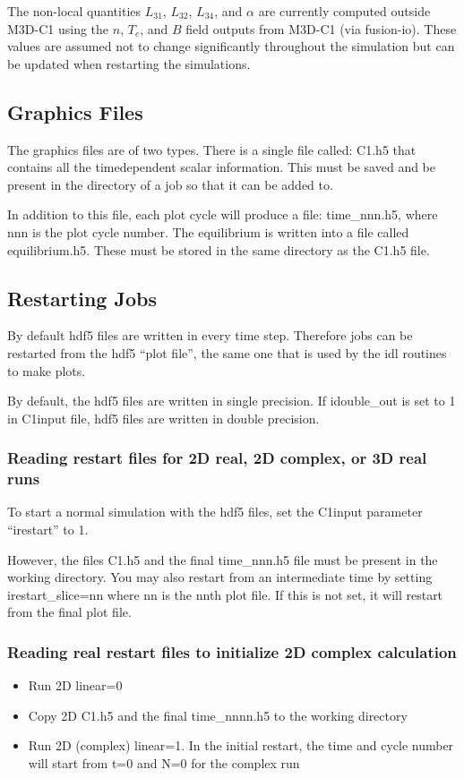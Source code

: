 The non-local quantities $L_{31}$, $L_{32}$, $L_{34}$, and $\alpha$ are currently computed outside M3D-C1 using the $n$, $T_e$, and $B$ field outputs from M3D-C1 (via fusion-io). These values are assumed not to change significantly throughout the simulation but can be updated when restarting the simulations.

\subsection{Graphics Files}
\noindent
The graphics files are of two types. There is a single file called: C1.h5 that contains all the timedependent scalar information. This must be saved and be present in the directory of a job so that it can be added to.

\noindent
In addition to this file, each plot cycle will produce a file: time\_nnn.h5, where nnn is the plot cycle
number. The equilibrium is written into a file called equilibrium.h5. These must be stored in the same
directory as the C1.h5 file.

\subsection{Restarting Jobs}

\noindent
By default  hdf5 files are written in every time step. Therefore jobs can be restarted from the hdf5 “plot file”, the same one that is used by the idl routines to make plots.

\noindent
By default, the hdf5 files are written in single precision. If idouble\_out is set to 1 in C1input file, hdf5 files are written in double precision.

\subsubsection{Reading restart files for 2D real, 2D complex, or 3D real runs}
To start a normal simulation with the hdf5 files, set the C1input parameter “irestart” to 1.

However, the files C1.h5 and the final time\_nnn.h5 file must be present in the working directory. You may also
restart from an intermediate time by setting irestart\_slice=nn where nn is the nnth plot file. If this is not
set, it will restart from the final plot file. 

\subsubsection{Reading real restart files to initialize 2D complex calculation}
\begin{itemize}
\item  Run 2D linear=0
\item  Copy 2D C1.h5 and the final time\_nnnn.h5 to the working directory
\item  Run 2D (complex) linear=1. In the initial restart, the time and cycle number will start from t=0
and N=0 for the complex run
\end{itemize}

